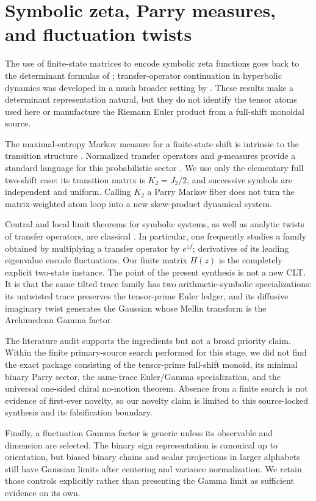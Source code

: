 \section{Symbolic zeta, Parry measures, and fluctuation twists}
\label{sec:related}

The use of finite-state matrices to encode symbolic zeta functions goes back
to the determinant formulas of \citet{bowenlanford1970}; transfer-operator
continuation in hyperbolic dynamics was developed in a much broader setting
by \citet{ruelle1976}. These results make a determinant representation natural,
but they do not identify the tensor atoms used here or manufacture the
Riemann Euler product from a full-shift monoidal source.

The maximal-entropy Markov measure for a finite-state shift is intrinsic to
the transition structure \citep{parry1964}. Normalized transfer operators and
$g$-measures provide a standard language for this probabilistic sector
\citep{keane1972,walters1975}. We use only the elementary full two-shift case:
its transition matrix is $K_2=J_2/2$, and successive symbols are independent
and uniform. Calling $K_2$ a Parry Markov fiber does not turn the
matrix-weighted atom loop into a new skew-product dynamical system.

Central and local limit theorems for symbolic systems, as well as analytic
twists of transfer operators, are classical
\citep{lalley1986,parrypollicott1990,coelhoparry1990,aaronsondenker2001}. In particular,
one frequently studies a family obtained by multiplying a transfer operator
by $e^{z f}$; derivatives of its leading eigenvalue encode fluctuations. Our
finite matrix $H(z)$ is the completely explicit two-state instance. The point
of the present synthesis is not a new CLT. It is that the same tilted trace
family has two arithmetic-symbolic specializations: its untwisted trace
preserves the tensor-prime Euler ledger, and its diffusive imaginary twist
generates the Gaussian whose Mellin transform is the Archimedean Gamma
factor.

The literature audit supports the ingredients but not a broad priority claim.
Within the finite primary-source search performed for this stage, we did not
find the exact package consisting of the tensor-prime full-shift monoid, its
minimal binary Parry sector, the same-trace Euler/Gamma specialization, and
the universal one-sided chiral no-motion theorem. Absence from a finite search is
not evidence of first-ever novelty, so our novelty claim is limited to this
source-locked synthesis and its falsification boundary.

Finally, a fluctuation Gamma factor is generic unless its observable and
dimension are selected. The binary sign representation is canonical up to
orientation, but biased binary chains and scalar projections in larger
alphabets still have Gaussian limits after centering and variance
normalization. We retain those controls explicitly rather than presenting the
Gamma limit as sufficient evidence on its own.
